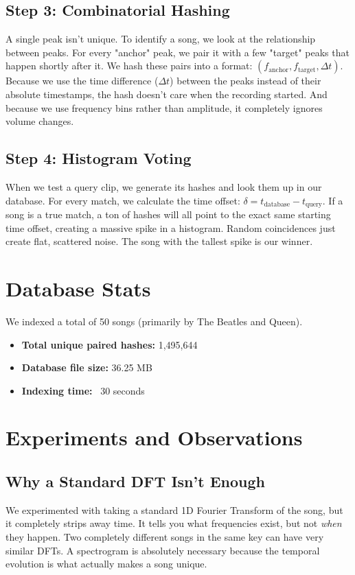 \documentclass[11pt, a4paper]{article}
\begin{document}
\subsection{Step 3: Combinatorial Hashing}
A single peak isn't unique. To identify a song, we look at the relationship between peaks. For every "anchor" peak, we pair it with a few "target" peaks that happen shortly after it. 
We hash these pairs into a format: $(f_{\text{anchor}}, f_{\text{target}}, \Delta t)$.
Because we use the time difference ($\Delta t$) between the peaks instead of their absolute timestamps, the hash doesn't care when the recording started. And because we use frequency bins rather than amplitude, it completely ignores volume changes.

\subsection{Step 4: Histogram Voting}
When we test a query clip, we generate its hashes and look them up in our database. For every match, we calculate the time offset: $\delta = t_{\text{database}} - t_{\text{query}}$. 
If a song is a true match, a ton of hashes will all point to the exact same starting time offset, creating a massive spike in a histogram. Random coincidences just create flat, scattered noise. The song with the tallest spike is our winner.

\section{Database Stats}
We indexed a total of 50 songs (primarily by The Beatles and Queen). 
\begin{itemize}
    \item \textbf{Total unique paired hashes:} 1,495,644
    \item \textbf{Database file size:} 36.25 MB
    \item \textbf{Indexing time:} ~30 seconds
\end{itemize}

\section{Experiments and Observations}

\subsection{Why a Standard DFT Isn't Enough}
We experimented with taking a standard 1D Fourier Transform of the song, but it completely strips away time. It tells you what frequencies exist, but not \textit{when} they happen. Two completely different songs in the same key can have very similar DFTs. A spectrogram is absolutely necessary because the temporal evolution is what actually makes a song unique.
\end{document}
